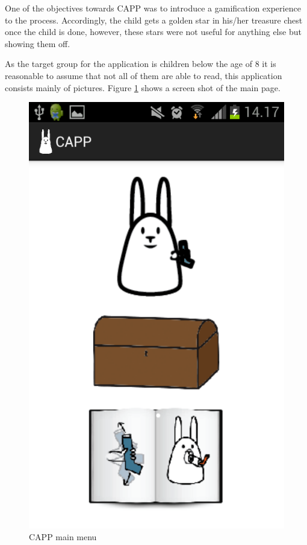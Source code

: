 One of the objectives towards CAPP was to introduce a gamification experience to the process. Accordingly, the child gets a golden star in his/her treasure chest once the child is done, however, these stars were not useful for anything else but showing them off.

As the target group for the application is children below the age of 8 it is reasonable to assume that not all of them are able to read, this application consists mainly of pictures.  
Figure \ref{fig:capp-main-menu} shows a screen shot of the main page. 

\begin{figure}
		\centering
			\includegraphics[width=0.20\paperwidth]{Pictures/app-screenshots/capp_main_menu.png}
		\caption{CAPP main menu}
		\label{fig:capp-main-menu}
\end{figure}



